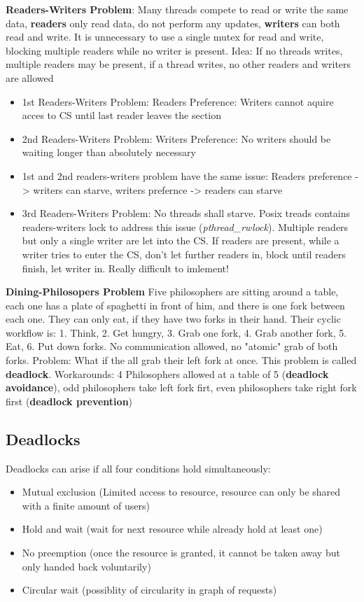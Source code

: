 \documentclass[11pt,a4paper]{article}
\begin{document}
	\textbf{Readers-Writers Problem}: Many threads compete to read or write the same data, \textbf{readers} only read data, do not perform any updates, \textbf{writers} can both read and write. It is unnecessary to use a single mutex for read and write, blocking multiple readers while no writer is present. Idea: If no threads writes, multiple readers may be present, if a thread writes, no other readers and writers are allowed
	\begin{itemize}
		\item 1st Readers-Writers Problem: Readers Preference: Writers cannot aquire acces to CS until last reader leaves the section
		\item 2nd Readers-Writers Problem: Writers Preference: No writers should be waiting longer than absolutely necessary
		\item 1st and 2nd readers-writers problem have the same issue: Readers preference -> writers can starve, writers prefernce -> readers can starve
		\item 3rd Readers-Writers Problem: No threads shall starve. Posix treads contains readers-writers lock to address this issue (\textit{pthread\_rwlock}). Multiple readers but only a single writer are let into the CS. If readers are present, while a writer tries to enter the CS, don't let further readers in, block until readers finish, let writer in.
		Really difficult to imlement!
	\end{itemize}
	
	\textbf{Dining-Philosopers Problem} \newline
	Five philosophers are sitting around a table, each one has a plate of spaghetti in front of him, and there is one fork between each one. They can only eat, if they have two forks in their hand. Their cyclic workflow is: 1. Think, 2. Get hungry, 3. Grab one fork, 4. Grab another fork, 5. Eat, 6. Put down forks. No communication allowed, no "atomic" grab of both forks. Problem: What if the all grab their left fork at once. This problem is called \textbf{deadlock}. Workarounds: 4 Philosophers allowed at a table of 5 (\textbf{deadlock avoidance}), odd philosophers take left fork firt, even philosophers take right fork first (\textbf{deadlock prevention}) \newline
	
	\subsection{Deadlocks} 
	Deadlocks can arise if all four conditions hold simultaneously:
	\begin{itemize}
		\item Mutual exclusion (Limited access to resource, resource can only be shared with a finite amount of users)
		\item Hold and wait (wait for next resource while already hold at least one)
		\item No preemption (once the resource is granted, it cannot be taken away but only handed back voluntarily)
		\item Circular wait (possiblity of circularity in graph of requests)
	\end{itemize}
	
\end{document}
